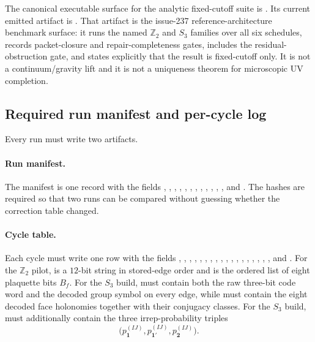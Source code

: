 \documentclass[11pt]{article}
\begin{document}
The canonical executable surface for the analytic fixed-cutoff suite is
. Its current emitted artifact is
. That artifact is
the issue-237 reference-architecture benchmark surface: it runs the named $\mathbb Z_2$ and $S_3$
families over all six schedules, records packet-closure and repair-completeness gates, includes the
residual-obstruction gate, and states explicitly that the result is fixed-cutoff only. It is not a
continuum/gravity lift and it is not a uniqueness theorem for microscopic UV completion.

\subsection{Required run manifest and per-cycle log}

Every run must write two artifacts.

\paragraph{Run manifest.}
The manifest is one record with the fields , ,
, , , ,
, , , ,
, , and .
The hashes are required so that two runs can be compared without guessing whether the correction
table changed.

\paragraph{Cycle table.}
Each cycle must write one row with the fields , ,
, , ,
, , ,
, , ,
, , ,
, , ,
, and . For the $\mathbb Z_2$ pilot, 
is a $12$-bit string in stored-edge order and  is the ordered list of eight
plaquette bits $B_f$. For the $S_3$ build,  must contain both the raw
three-bit code word and the decoded group symbol on every edge, while  must
contain the eight decoded face holonomies together with their conjugacy classes. For the $S_3$
build,  must additionally
contain the three irrep-probability triples
\begin{equation}
\bigl(p_{\mathbf 1}^{(IJ)},p_{\mathbf 1'}^{(IJ)},p_{\mathbf 2}^{(IJ)}\bigr).
\end{equation}
\end{document}
